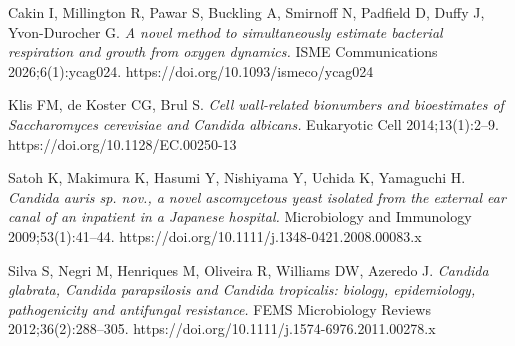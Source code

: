 \documentclass[
]{article}
\begin{document}
Cakin I, Millington R, Pawar S, Buckling A, Smirnoff N, Padfield D,
Duffy J, Yvon-Durocher G. \emph{A novel method to simultaneously
estimate bacterial respiration and growth from oxygen dynamics.} ISME
Communications 2026;6(1):ycag024. https://doi.org/10.1093/ismeco/ycag024

Klis FM, de Koster CG, Brul S. \emph{Cell wall-related bionumbers and
bioestimates of Saccharomyces cerevisiae and Candida albicans.}
Eukaryotic Cell 2014;13(1):2--9. https://doi.org/10.1128/EC.00250-13

Satoh K, Makimura K, Hasumi Y, Nishiyama Y, Uchida K, Yamaguchi H.
\emph{Candida auris sp. nov., a novel ascomycetous yeast isolated from
the external ear canal of an inpatient in a Japanese hospital.}
Microbiology and Immunology 2009;53(1):41--44.
https://doi.org/10.1111/j.1348-0421.2008.00083.x

Silva S, Negri M, Henriques M, Oliveira R, Williams DW, Azeredo J.
\emph{Candida glabrata, Candida parapsilosis and Candida tropicalis:
biology, epidemiology, pathogenicity and antifungal resistance.} FEMS
Microbiology Reviews 2012;36(2):288--305.
https://doi.org/10.1111/j.1574-6976.2011.00278.x
\end{document}
